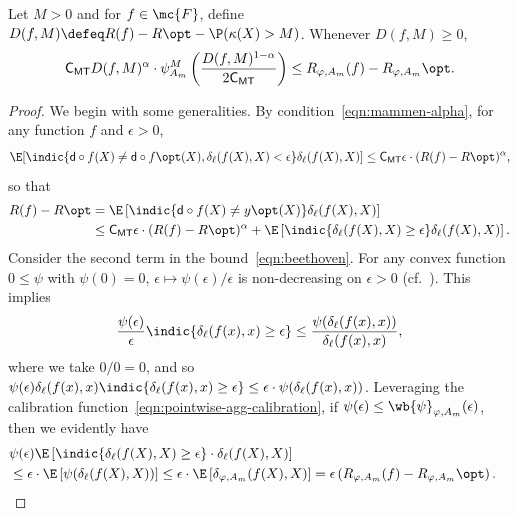 \documentclass[11pt]{article}
\newcommand{\prn}[1]{\left({#1}\right)} %
\newcommand{\constant}{\mathsf{C}}  %
\newcommand{\cstMT}{\constant_{\mathsf{MT}}}
\newcommand{\pred}{\mathsf{d}}  %
\newcommand{\tloss}{\ell}  %
\newcommand{\sloss}{\varphi}  %
\newcommand{\extloss}{\delta_\tloss}
\newcommand{\exslossaggm}{\delta_{\sloss,A_m}}
\begin{document}
\begin{lemma}
  \label{lem:D-noise-comparison-inequality}
  Let $M > 0$ and for $f \in \mc{F}$,
  define $D(f, M) \defeq R(f) - R\opt - \P(\kappa(X) > M)$.
  Whenever $D(f, M) \ge 0$,
  \begin{equation*}
    \cstMT D(f, M)^\alpha \cdot
    \psi_{A_m}^M \prn{\frac{D(f,M)^{1-\alpha}}{2\cstMT}}
    \leq R_{\sloss,A_m}(f) - R_{\sloss,A_m}\opt.
  \end{equation*} 
\end{lemma}
\begin{proof}
  We begin with some generalities.
  By condition~\eqref{eqn:mammen-alpha}, for any function $f$ and
  $\epsilon > 0$,
  \begin{equation*}
    \E[\indic{\pred \circ f(X) \neq \pred \circ f\opt(X),
        \extloss(f(X), X) < \epsilon}
      \extloss(f(X), X)]
    \le \cstMT \epsilon \cdot (R(f) - R\opt)^\alpha,
  \end{equation*}
  so that
  \begin{align}
    R(f) - R\opt & = 
    \E\left[\indic{\pred \circ f(X) \neq y\opt(X)}
      \extloss(f(X), X)\right] \nonumber \\
    & \le \cstMT \epsilon \cdot (R(f) - R\opt)^\alpha
    + \E\left[\indic{\extloss(f(X), X) \ge \epsilon}
      \extloss(f(X), X)\right].
    \label{eqn:beethoven}
  \end{align}
  Consider the second term in the bound~\eqref{eqn:beethoven}.
  For any convex function $0 \le \psi$ with $\psi(0) = 0$,
  $\epsilon \mapsto \psi(\epsilon) / \epsilon$ is non-decreasing
  on $\epsilon > 0$ (cf.~\citet[Ch.~1]{HiriartUrrutyLe93}).
  This implies
  \begin{equation*}
    \frac{\psi(\epsilon)}{\epsilon}
    \indic{\extloss(f(x), x) \ge \epsilon}
    \le \frac{\psi(\extloss(f(x), x))}{\extloss(f(x), x)},
  \end{equation*}
  where we take $0/0 = 0$, and
  so $\psi(\epsilon) \extloss(f(x), x)
  \indic{\extloss(f(x), x) \ge \epsilon}
  \le \epsilon \cdot \psi(\extloss(f(x), x))$.
  Leveraging the calibration function~\eqref{eqn:pointwise-agg-calibration},
  if $\psi(\epsilon) \le \wb{\psi}_{\sloss, A_m}(\epsilon)$,
  then we evidently
  have
  \begin{align}
    \lefteqn{\psi(\epsilon)
      \E\left[\indic{\extloss(f(X), X) \ge \epsilon}
        \cdot \extloss(f(X), X)\right]} \nonumber \\
    & \le \epsilon \cdot
    \E\left[\psi(\extloss(f(X), X))\right]
    \le \epsilon \cdot \E\left[\exslossaggm(f(X), X)\right]
    = \epsilon \left(R_{\sloss,A_m}(f) - R_{\sloss,A_m}\opt\right).
    \label{eqn:bartok}
  \end{align}
  

\end{proof}
\end{document}
